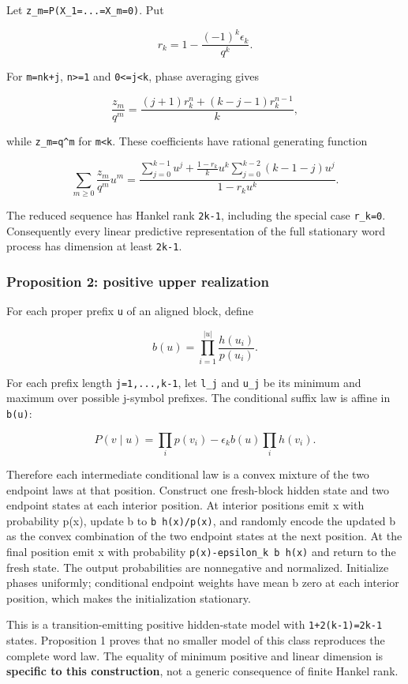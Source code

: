 \documentclass[
  10pt,
  a4paper,
]{article}
\begin{document}
Let \texttt{z\_m=P(X\_1=...=X\_m=0)}. Put

\[
 r_k=1-\frac{(-1)^k\epsilon_k}{q^k}.
\]

For \texttt{m=nk+j}, \texttt{n\textgreater{}=1} and \texttt{0\textless{}=j\textless{}k}, phase averaging gives

\[
\frac{z_m}{q^m}=\frac{(j+1)r_k^n+(k-j-1)r_k^{n-1}}{k},
\]

while \texttt{z\_m=q\^{}m} for \texttt{m\textless{}k}. These coefficients have rational generating function

\[
\sum_{m\ge0}\frac{z_m}{q^m}u^m=
\frac{\sum_{j=0}^{k-1}u^j+\frac{1-r_k}{k}u^k\sum_{j=0}^{k-2}(k-1-j)u^j}{1-r_k u^k}.
\]

The reduced sequence has Hankel rank \texttt{2k-1}, including the special case \texttt{r\_k=0}. Consequently every linear predictive representation of the full stationary word process has dimension at least \texttt{2k-1}.

\subsubsection{Proposition 2: positive upper realization}\label{proposition-2-positive-upper-realization}

For each proper prefix \texttt{u} of an aligned block, define

\[
 b(u)=\prod_{i=1}^{|u|}\frac{h(u_i)}{p(u_i)}.
\]

For each prefix length \texttt{j=1,...,k-1}, let \texttt{l\_j} and \texttt{u\_j} be its minimum and maximum over possible j-symbol prefixes. The conditional suffix law is affine in \texttt{b(u)}:

\[
P(v\mid u)=\prod_i p(v_i)-\epsilon_k b(u)\prod_i h(v_i).
\]

Therefore each intermediate conditional law is a convex mixture of the two endpoint laws at that position. Construct one fresh-block hidden state and two endpoint states at each interior position. At interior positions emit x with probability p(x), update b to \texttt{b\ h(x)/p(x)}, and randomly encode the updated b as the convex combination of the two endpoint states at the next position. At the final position emit x with probability \texttt{p(x)-epsilon\_k\ b\ h(x)} and return to the fresh state. The output probabilities are nonnegative and normalized. Initialize phases uniformly; conditional endpoint weights have mean b zero at each interior position, which makes the initialization stationary.

This is a transition-emitting positive hidden-state model with \texttt{1+2(k-1)=2k-1} states. Proposition 1 proves that no smaller model of this class reproduces the complete word law. The equality of minimum positive and linear dimension is \textbf{specific to this construction}, not a generic consequence of finite Hankel rank.
\end{document}

